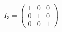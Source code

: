 \documentclass[preview]{standalone}
\begin{document}
\begin{align*}
I_3 = \begin{pmatrix}1&0&0\\0&1&0\\0&0&1\end{pmatrix}
\end{align*}
\end{document}
